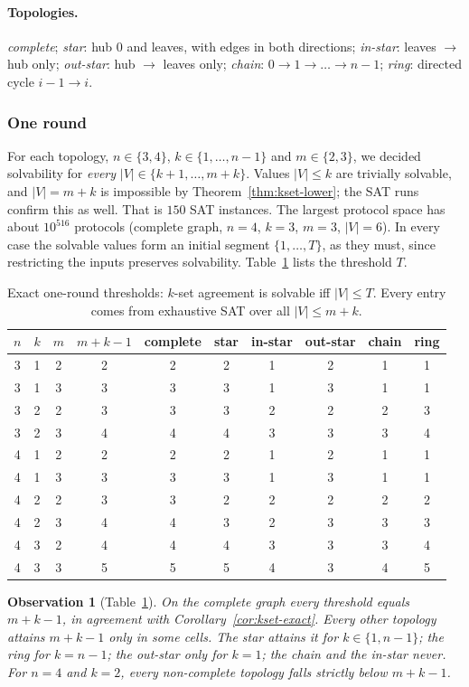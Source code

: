 \documentclass[11pt]{article}
\newtheorem{observation}[theorem]{Observation}
\begin{document}
\paragraph{Topologies.} \emph{complete}; \emph{star}: hub $0$ and leaves, with edges in both directions; \emph{in-star}: leaves $\to$ hub only; \emph{out-star}: hub $\to$ leaves only; \emph{chain}: $0\to1\to\dots\to n-1$; \emph{ring}: directed cycle $i-1\to i$.

\subsubsection{One round}

For each topology, $n\in\{3,4\}$, $k\in\{1,\dots,n-1\}$ and $m\in\{2,3\}$, we decided solvability for \emph{every} $|V|\in\{k+1,\dots,m+k\}$. Values $|V|\le k$ are trivially solvable, and $|V|=m+k$ is impossible by Theorem~\ref{thm:kset-lower}; the SAT runs confirm this as well. That is $150$ SAT instances. The largest protocol space has about $10^{516}$ protocols (complete graph, $n=4$, $k=3$, $m=3$, $|V|=6$). In every case the solvable values form an initial segment $\{1,\dots,T\}$, as they must, since restricting the inputs preserves solvability. Table~\ref{tab:r1} lists the threshold $T$.

\begin{table}[ht]
\centering
\begin{tabular}{ccc|c|cccccc}
\hline
$n$ & $k$ & $m$ & $m+k-1$ & complete & star & in-star & out-star & chain & ring\\
\hline
3&1&2&2& 2&2&1&2&1&1\\
3&1&3&3& 3&3&1&3&1&1\\
3&2&2&3& 3&3&2&2&2&3\\
3&2&3&4& 4&4&3&3&3&4\\
\hline
4&1&2&2& 2&2&1&2&1&1\\
4&1&3&3& 3&3&1&3&1&1\\
4&2&2&3& 3&2&2&2&2&2\\
4&2&3&4& 4&3&2&3&3&3\\
4&3&2&4& 4&4&3&3&3&4\\
4&3&3&5& 5&5&4&3&4&5\\
\hline
\end{tabular}
\caption{Exact one-round thresholds: $k$-set agreement is solvable iff $|V|\le T$. Every entry comes from exhaustive SAT over all $|V|\le m+k$.}\label{tab:r1}
\end{table}

\begin{observation}[Table~\ref{tab:r1}]\label{obs:r1}
On the complete graph every threshold equals $m+k-1$, in agreement with Corollary~\ref{cor:kset-exact}. Every other topology attains $m+k-1$ only in some cells. The star attains it for $k\in\{1,n-1\}$; the ring for $k=n-1$; the out-star only for $k=1$; the chain and the in-star never. For $n=4$ and $k=2$, every non-complete topology falls strictly below $m+k-1$.
\end{observation}
\end{document}
